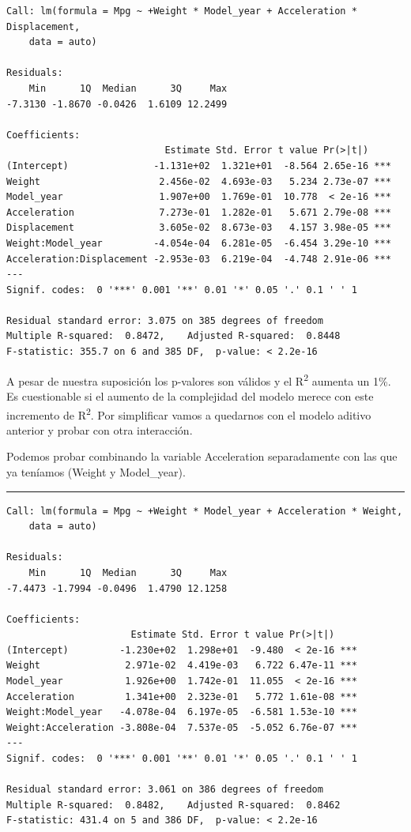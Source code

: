 \begin{verbatim}
Call: lm(formula = Mpg ~ +Weight * Model_year + Acceleration * Displacement, 
    data = auto)

Residuals:
    Min      1Q  Median      3Q     Max 
-7.3130 -1.8670 -0.0426  1.6109 12.2499 

Coefficients:
                            Estimate Std. Error t value Pr(>|t|)    
(Intercept)               -1.131e+02  1.321e+01  -8.564 2.65e-16 ***
Weight                     2.456e-02  4.693e-03   5.234 2.73e-07 ***
Model_year                 1.907e+00  1.769e-01  10.778  < 2e-16 ***
Acceleration               7.273e-01  1.282e-01   5.671 2.79e-08 ***
Displacement               3.605e-02  8.673e-03   4.157 3.98e-05 ***
Weight:Model_year         -4.054e-04  6.281e-05  -6.454 3.29e-10 ***
Acceleration:Displacement -2.953e-03  6.219e-04  -4.748 2.91e-06 ***
---
Signif. codes:  0 '***' 0.001 '**' 0.01 '*' 0.05 '.' 0.1 ' ' 1

Residual standard error: 3.075 on 385 degrees of freedom
Multiple R-squared:  0.8472,    Adjusted R-squared:  0.8448 
F-statistic: 355.7 on 6 and 385 DF,  p-value: < 2.2e-16
\end{verbatim}

A pesar de nuestra suposición los p-valores son válidos y el R\textsuperscript{2} aumenta un 1\%. Es cuestionable si el aumento de la complejidad del modelo merece con este incremento de R\textsuperscript{2}. Por simplificar vamos a quedarnos con el modelo aditivo anterior y probar con otra interacción.

\vspace{\baselineskip}

Podemos probar combinando la variable Acceleration separadamente con las que ya teníamos (Weight y Model\_year).

\begin{center}\rule{\linewidth}{0.5pt}\end{center}

\begin{verbatim}
Call: lm(formula = Mpg ~ +Weight * Model_year + Acceleration * Weight, 
    data = auto)

Residuals:
    Min      1Q  Median      3Q     Max 
-7.4473 -1.7994 -0.0496  1.4790 12.1258 

Coefficients:
                      Estimate Std. Error t value Pr(>|t|)    
(Intercept)         -1.230e+02  1.298e+01  -9.480  < 2e-16 ***
Weight               2.971e-02  4.419e-03   6.722 6.47e-11 ***
Model_year           1.926e+00  1.742e-01  11.055  < 2e-16 ***
Acceleration         1.341e+00  2.323e-01   5.772 1.61e-08 ***
Weight:Model_year   -4.078e-04  6.197e-05  -6.581 1.53e-10 ***
Weight:Acceleration -3.808e-04  7.537e-05  -5.052 6.76e-07 ***
---
Signif. codes:  0 '***' 0.001 '**' 0.01 '*' 0.05 '.' 0.1 ' ' 1

Residual standard error: 3.061 on 386 degrees of freedom
Multiple R-squared:  0.8482,    Adjusted R-squared:  0.8462 
F-statistic: 431.4 on 5 and 386 DF,  p-value: < 2.2e-16
\end{verbatim}

